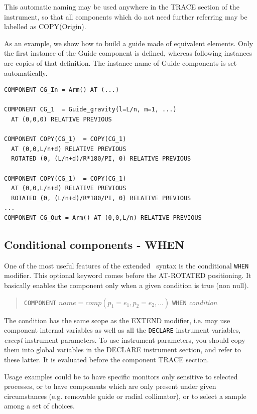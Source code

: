 This automatic naming may be used anywhere in the TRACE section of the
instrument, so that all components which do not need further referring may be
labelled as COPY(Origin).

As an example, we show how to build a guide made of equivalent elements. Only
the first instance of the Guide component is defined, whereas following
instances are copies of that definition. The instance name of Guide components
is set automatically.

\begin{verbatim}
COMPONENT CG_In = Arm() AT (...)

COMPONENT CG_1  = Guide_gravity(l=L/n, m=1, ...)
  AT (0,0,0) RELATIVE PREVIOUS

COMPONENT COPY(CG_1)  = COPY(CG_1)
  AT (0,0,L/n+d) RELATIVE PREVIOUS
  ROTATED (0, (L/n+d)/R*180/PI, 0) RELATIVE PREVIOUS

COMPONENT COPY(CG_1)  = COPY(CG_1)
  AT (0,0,L/n+d) RELATIVE PREVIOUS
  ROTATED (0, (L/n+d)/R*180/PI, 0) RELATIVE PREVIOUS
...
COMPONENT CG_Out = Arm() AT (0,0,L/n) RELATIVE PREVIOUS
\end{verbatim}

\subsection{Conditional components - WHEN}
\label{s:instrdefs-extend-when}

One of the most useful features of the extended \MCS\ syntax is the conditional
\texttt{WHEN} modifier. This optional keyword comes before the AT-ROTATED
positioning. It basically enables the component only when a given condition is
true (non null).

\begin{quote}
  \texttt{COMPONENT} $\textit{name} = \textit{comp}(p_1 = e_1, p_2 = e_2, \ldots)$
  \texttt{WHEN} {\it condition}
\end{quote}
The condition has the same scope as the EXTEND modifier, i.e. may use component
internal variables as well as all the \texttt{DECLARE} instrument variables,
\emph{except} instrument parameters. To use instrument parameters, you should
copy them into global variables in the DECLARE instrument section, and refer to
these latter.  It is evaluated before the component TRACE section.

Usage examples could be to have specific monitors only sensitive to selected
processes, or to have components which are only present under given
circumstances (e.g. removable guide or radial collimator), or to select a sample
among a set of choices.


